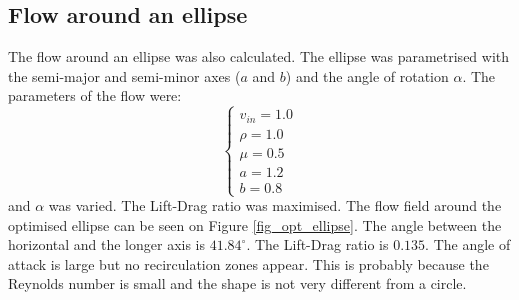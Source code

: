 \documentclass[12pt, a4paper]{article}
\begin{document}
\subsection{Flow around an ellipse}
The flow around an ellipse was also calculated. The ellipse was parametrised with the semi-major and semi-minor axes ($a$ and $b$) and the angle of rotation $\alpha$. The parameters of the flow were:
\begin{equation}
\begin{cases}
v_{in} = 1.0 \\
\rho = 1.0 \\
\mu = 0.5 \\
a = 1.2 \\
b = 0.8
\end{cases}
\end{equation}
and $\alpha$ was varied. The Lift-Drag ratio was maximised. The flow field around the optimised ellipse can be seen on Figure \ref{fig_opt_ellipse}. The angle between the horizontal and the longer axis is $41.84^{\circ}$. The Lift-Drag ratio is $0.135$. The angle of attack is large but no recirculation zones appear. This is probably because the Reynolds number is small and the shape is not very different from a circle.
\end{document}

